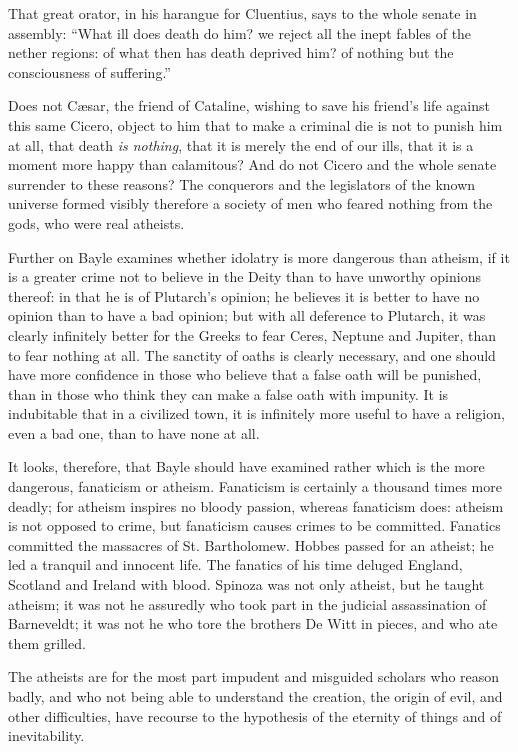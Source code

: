 That great orator, in his harangue for Cluentius, says to the whole
senate in assembly: \enquote{What ill does death do him? we reject all the inept
fables of the nether regions: of what then has death deprived him? of
nothing but the consciousness of suffering.}

Does not Cæsar, the friend of Cataline, wishing to save his friend's
life against this same Cicero, object to him that to make a criminal die
is not to punish him at all, that death \textit{is nothing}, that it is merely
the end of our ills, that it is a moment more happy than calamitous? And
do not Cicero and the whole senate surrender to these reasons? The
conquerors and the legislators of the known universe formed visibly
therefore a society of men who feared nothing from the gods, who were
real atheists.

Further on Bayle examines whether idolatry is more dangerous than
atheism, if it is a greater crime not to believe in the Deity than to
have unworthy opinions thereof: in that he is of Plutarch's opinion; he
believes it is better to have no opinion than to have a bad opinion; but
with all deference to Plutarch, it was clearly infinitely better for the
Greeks to fear Ceres, Neptune and Jupiter, than to fear nothing at all.
The sanctity of oaths is clearly necessary, and one should have more
confidence in those who believe that a false oath will be punished, than
in those who think they can make a false oath with impunity. It is
indubitable that in a civilized town, it is infinitely more useful to
have a religion, even a bad one, than to have none at all.

It looks, therefore, that Bayle should have examined rather which is the
more dangerous, fanaticism or atheism. Fanaticism is certainly a
thousand times more deadly; for atheism inspires no bloody passion,
whereas fanaticism does: atheism is not opposed to crime, but fanaticism
causes crimes to be committed. Fanatics committed the massacres of St.
Bartholomew. Hobbes passed for an atheist; he led a tranquil and
innocent life. The fanatics of his time deluged England, Scotland and
Ireland with blood. Spinoza was not only atheist, but he taught atheism;
it was not he assuredly who took part in the judicial assassination of
Barneveldt; it was not he who tore the brothers De Witt in pieces, and
who ate them grilled.

The atheists are for the most part impudent and misguided scholars who
reason badly, and who not being able to understand the creation, the
origin of evil, and other difficulties, have recourse to the hypothesis
of the eternity of things and of inevitability.

